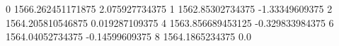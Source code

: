 0 1566.262451171875 2.075927734375
1 1562.85302734375 -1.33349609375
2 1564.205810546875 0.019287109375
4 1563.856689453125 -0.329833984375
6 1564.04052734375 -0.14599609375
8 1564.1865234375 0.0
